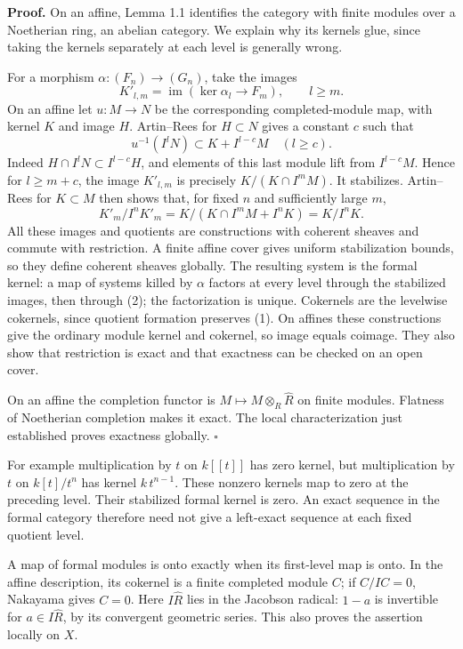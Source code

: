 \documentclass[11pt]{article}
\begin{document}
\textbf{Proof.} On an affine, Lemma 1.1 identifies the category with
finite modules over a Noetherian ring, an abelian category. We explain
why its kernels glue, since taking the kernels separately at each level
is generally wrong.

For a morphism \(\alpha:(F_n)\to(G_n)\), take the images \[
K'_{l,m}=\operatorname{im}(\ker\alpha_l\to F_m),\qquad l\geq m.
\] On an affine let \(u:M\to N\) be the corresponding completed-module
map, with kernel \(K\) and image \(H\). Artin--Rees for \(H\subset N\)
gives a constant \(c\) such that \[
u^{-1}(I^lN)\subset K+I^{l-c}M\quad(l\geq c).
\] Indeed \(H\cap I^lN\subset I^{l-c}H\), and elements of this last
module lift from \(I^{l-c}M\). Hence for \(l\geq m+c\), the image
\(K'_{l,m}\) is precisely \(K/(K\cap I^mM)\). It stabilizes. Artin--Rees
for \(K\subset M\) then shows that, for fixed \(n\) and sufficiently
large \(m\), \[
K'_m/I^nK'_m
=K/(K\cap I^mM+I^nK)=K/I^nK.
\tag{2}
\] All these images and quotients are constructions with coherent
sheaves and commute with restriction. A finite affine cover gives
uniform stabilization bounds, so they define coherent sheaves globally.
The resulting system is the formal kernel: a map of systems killed by
\(\alpha\) factors at every level through the stabilized images, then
through (2); the factorization is unique. Cokernels are the levelwise
cokernels, since quotient formation preserves (1). On affines these
constructions give the ordinary module kernel and cokernel, so image
equals coimage. They also show that restriction is exact and that
exactness can be checked on an open cover.

On an affine the completion functor is \(M\mapsto M\otimes_R\widehat R\)
on finite modules. Flatness of Noetherian completion makes it exact. The
local characterization just established proves exactness globally.
\(\square\)

For example multiplication by \(t\) on \(k[[t]]\) has zero kernel, but
multiplication by \(t\) on \(k[t]/t^n\) has kernel \(k\,t^{n-1}\). These
nonzero kernels map to zero at the preceding level. Their stabilized
formal kernel is zero. An exact sequence in the formal category
therefore need not give a left-exact sequence at each fixed quotient
level.

A map of formal modules is onto exactly when its first-level map is
onto. In the affine description, its cokernel is a finite completed
module \(C\); if \(C/IC=0\), Nakayama gives \(C=0\). Here
\(I\widehat R\) lies in the Jacobson radical: \(1-a\) is invertible for
\(a\in I\widehat R\), by its convergent geometric series. This also
proves the assertion locally on \(X\).
\end{document}
